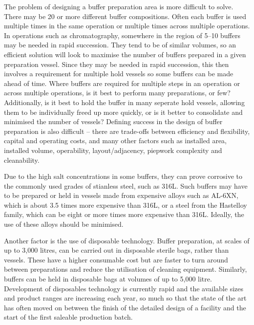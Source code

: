 The problem of designing a buffer preparation area is more difficult to solve.
There may be 20 or more different buffer compositions.  Often each buffer is
used multiple times in the same operation or multiple times across multiple
operations.  In operations such as chromatography, somewhere in the region of
5--10 buffers may be needed in rapid succession.  They tend to be of similar 
volumes, so an efficient solution will look to maximise the number of buffers
prepared in a given preparation vessel.  Since they may be needed in rapid
succession, this then involves a requirement for multiple hold vessels so
some buffers can be made ahead of time.  Where buffers are required for multiple
steps in an operation or across multiple operations, is it best to perform
many preparations, or few?  Additionally, is it best to hold the buffer
in many seperate hold vessels, allowing them to be individually freed up more
quickly, or is it better to consolidate and minimised the number of vessels?
Defining success in the design of buffer preparation is also difficult -- there
are trade-offs between efficiency and flexibility, capital and operating costs,
and many other factors such as installed area, installed volume, operability, 
layout/adjacency, piepwork complexity and cleanability.

Due to the high salt concentrations in some buffers, they can prove corrosive
to the commonly used grades of stianless steel, such as 316L.  Such buffers
may have to be prepared or held in vessels made from expensive alloys such as
AL-6XN\textsuperscript{\textregistered}, which is about 3.5 times more
expensive than 316L, or a steel from the
Hastelloy\textsuperscript{\textregistered} family, which can be eight or more
times more expensive than 316L.
Ideally, the use of these alloys should be minimised.

Another factor is the use of disposable technology.  Buffer preparation, at
scales of up to 3,000 litres, can be carried out in disposable sterile bags,
rather than vessels.  These have a higher consumable cost but are faster to turn
around between preparations and reduce the utilisation of cleaning equipment.
Similarly, buffers can be held in disposable bags at volumes of up to 5,000
litre.  Development of disposables technology is currently rapid and the
available sizes and product ranges are increasing each year, so much so that 
the state of the art has often moved on between the finish of the detailed
design of a facility and the start of the first saleable production batch.

